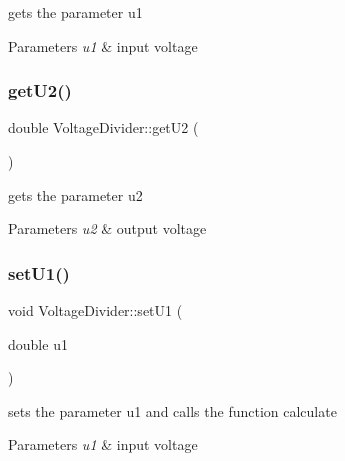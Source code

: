 gets the parameter u1 


\begin{DoxyParams}{Parameters}
{\em u1} & input voltage \\
\hline
\end{DoxyParams}
\mbox{\label{classVoltageDivider_aee0957fabf473c72488e3d5fa7316bcd}} 
\subsubsection{\texorpdfstring{get\+U2()}{getU2()}}
{\footnotesize\ttfamily double Voltage\+Divider\+::get\+U2 (\begin{DoxyParamCaption}{ }\end{DoxyParamCaption})}



gets the parameter u2 


\begin{DoxyParams}{Parameters}
{\em u2} & output voltage \\
\hline
\end{DoxyParams}
\mbox{\label{classVoltageDivider_aecff4be4ac8dbe9dbee07f57a15cc370}} 
\subsubsection{\texorpdfstring{set\+U1()}{setU1()}}
{\footnotesize\ttfamily void Voltage\+Divider\+::set\+U1 (\begin{DoxyParamCaption}\item[{double}]{u1 }\end{DoxyParamCaption})}



sets the parameter u1 and calls the function calculate 


\begin{DoxyParams}{Parameters}
{\em u1} & input voltage \\
\hline
\end{DoxyParams}
\mbox{\label{classVoltageDivider_a52270fd71980ed94bc64e7a6f65a9e5c}} 
